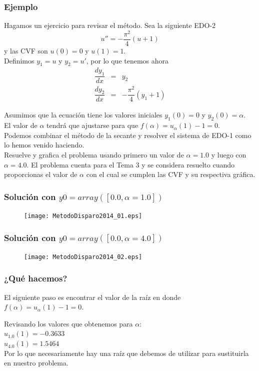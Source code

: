\begin{frame}
\frametitle{Ejemplo}
Hagamos un ejercicio para revisar el método. Sea la siguiente EDO-2
\begin{equation}
u'' = - \dfrac{\pi^{2}}{4}(u+1)
\end{equation}
y las CVF son $u(0)=0$ y $u(1)=1$. 
\\
\medskip
\pause
Definimos $y_{1}=u$ y $y_{2}=u'$, por lo que tenemos ahora
\begin{eqnarray}
\dfrac{dy_{1}}{dx} &=& y_{2} \\
\dfrac{dy_{2}}{dx} &=& - \dfrac{\pi^{2}}{4}(y_{1} + 1)
\end{eqnarray}
\end{frame}
\begin{frame}
Asumimos que la ecuación tiene los valores iniciales $y_{1}(0)=0$ y $y_{2}(0) = \alpha$.
\\
\medskip
\pause
El valor de $\alpha$ tendrá que ajustarse para que $f(\alpha) = u_{\alpha}(1) - 1 = 0$.
\\
\medskip
Podemos combinar el método de la secante y resolver el sistema de EDO-1 como lo hemos venido haciendo.
\\
\medskip
Resuelve y grafica el problema usando primero un valor de $\alpha=1.0$ y luego con $\alpha=4.0$. El problema cuenta para el Tema 3 y se considera resuelto cuando proporcionas el valor de $\alpha$ con el cual se cumplen las CVF y su respectiva gráfica.
\end{frame}
\begin{frame}[fragile]
\frametitle{Solución con $y0 = array([0.0,\alpha=1.0])$}
\begin{figure}
	\centering
	\texttt{[image: MetodoDisparo2014\_01.eps]}
\end{figure}
\end{frame}
\begin{frame}[fragile]
\frametitle{Solución con $y0 = array([0.0,\alpha=4.0])$}
\begin{figure}
	\centering
	\texttt{[image: MetodoDisparo2014\_02.eps]}
\end{figure}
\end{frame}
\begin{frame}
\frametitle{¿Qué hacemos?}
El siguiente paso es encontrar el valor de la raíz en donde $f(\alpha) = u_{\alpha}(1) - 1 = 0$.
\\
\medskip

Revisando los valores que obtenemos para $\alpha$:
\\
\medskip
$u_{1.0}(1) = -0.3633$ \\
$u_{4.0}(1) = 1.5464$
\\
\medskip
Por lo que necesariamente hay una raíz que debemos de utilizar para sustituirla en nuestro problema.
\end{frame}
